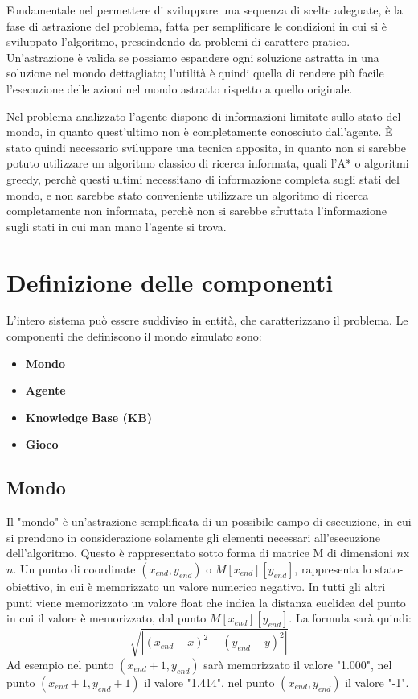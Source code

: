 Fondamentale nel permettere di sviluppare una sequenza di scelte adeguate, è la fase di astrazione del problema, fatta per semplificare le condizioni in cui si è sviluppato l'algoritmo, prescindendo da problemi di carattere pratico. Un'astrazione è valida se possiamo espandere ogni soluzione astratta in una soluzione nel mondo dettagliato; l'utilità è quindi quella di rendere più facile l'esecuzione delle azioni nel mondo astratto rispetto a quello originale. 

Nel problema analizzato l'agente dispone di informazioni limitate sullo stato del mondo, in quanto quest'ultimo non è completamente conosciuto dall'agente. È stato quindi necessario sviluppare una tecnica apposita, in quanto non si sarebbe potuto utilizzare un algoritmo classico di ricerca informata, quali l'A* o algoritmi greedy, perchè questi ultimi necessitano di informazione completa sugli stati del mondo, e non sarebbe stato conveniente utilizzare un algoritmo di ricerca completamente non informata, perchè non si sarebbe sfruttata l'informazione sugli stati in cui man mano l'agente si trova.


\section{Definizione delle componenti}
L'intero sistema può essere suddiviso in entità, che caratterizzano il problema. 
Le componenti che definiscono il mondo simulato sono:
\begin{itemize}
\item \textbf{Mondo}

\item \textbf{Agente}

\item \textbf{Knowledge Base (KB)}

\item \textbf{Gioco} 	
\end{itemize}

\subsection{Mondo}
Il "mondo" è un'astrazione semplificata di un possibile campo di esecuzione, in cui si prendono in considerazione solamente gli elementi necessari all'esecuzione dell'algoritmo. Questo è rappresentato sotto forma di matrice M di dimensioni $n$x$n$. Un punto di coordinate $(x_{end}, y_{end})$ o $M[x_{end}][y_{end}]$, rappresenta lo stato-obiettivo, in cui è memorizzato un valore numerico negativo. In tutti gli altri punti viene memorizzato un valore float che indica la distanza euclidea del punto in cui il valore è memorizzato, dal punto $M[x_{end}][y_{end}]$. La formula sarà quindi:
$$\sqrt{|(x_{end} - x)^2 + (y_{end} - y)^2|}$$
Ad esempio nel punto $(x_{end}+1, y_{end})$ sarà memorizzato il valore "1.000", nel punto $(x_{end}+1, y_{end}+1)$ il valore "1.414", nel punto $(x_{end}, y_{end})$ il valore "-1". 

